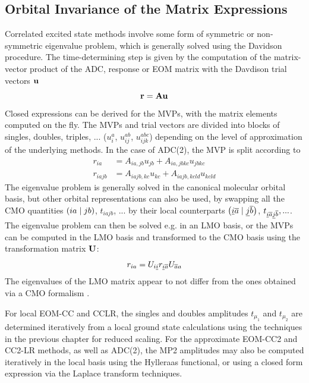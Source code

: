 \subsection{Orbital Invariance of the Matrix Expressions}

Correlated excited state methods involve some form of symmetric or non-symmetric eigenvalue problem, which is generally solved using the Davidson procedure. The time-determining step is given by the computation of the matrix-vector product of the ADC, response or EOM matrix with the Davdison trial vectors $\mathbf{u}$
\begin{equation}
\mathbf{r} = \mathbf{A} \mathbf{u}
\end{equation}
\noindent Closed expressions can be derived for the MVPs, with the matrix elements computed on the fly. The MVPs and trial vectors are divided into blocks of singles, doubles, triples, ... ($u_i^a$, $u_{ij}^{ab}$, $u_{ijk}^{abc}$) depending on the level of approximation of the underlying methods. In the case of ADC(2), the MVP is split according to
\begin{align}
r_{ia} &= A_{ia,jb} u_{jb} + A_{ia,jbkc} u_{jbkc} \\
r_{iajb} &= A_{iajb,kc} u_{kc} + A_{iajb,kcld} u_{kcld} 
\end{align}
\noindent The eigenvalue problem is generally solved in the canonical molecular orbital basis, but other orbital representations can also be used, by swapping all the CMO quantities $\left( ia \mid jb \right)$, $t_{iajb}$, ... by their local counterparts $\left( \underline{i}\overline{a} \mid \underline{j}\overline{b} \right)$, $t_{\underline{i}\overline{a}\underline{j}\overline{b}}, ...$. The eigenvalue problem can then be solved e.g. in an LMO basis, or the MVPs can be computed in the LMO basis and transformed to the CMO basis using the transformation matrix $\mathbf{U}$:
\begin{equation}
r_{ia} = U_{i\underline{i}} r_{\underline{i}\overline{a}} U_{\overline{a} a} 
\end{equation}
\noindent The eigenvalues of the LMO matrix appear to not differ from the ones obtained via a CMO formalism \cite{Kats2009}.

For local EOM-CC and CCLR, the singles and doubles amplitudes $t_{\mu_1}$ and $t_{\mu_2}$ are determined iteratively from a local ground state calculations using the techniques in the previous chapter for reduced scaling. For the approximate EOM-CC2 and CC2-LR methods, as well as ADC(2), the MP2 amplitudes may also be computed iteratively in the local basis using the Hylleraas functional, or using a closed form expression via the Laplace transform techniques.   

